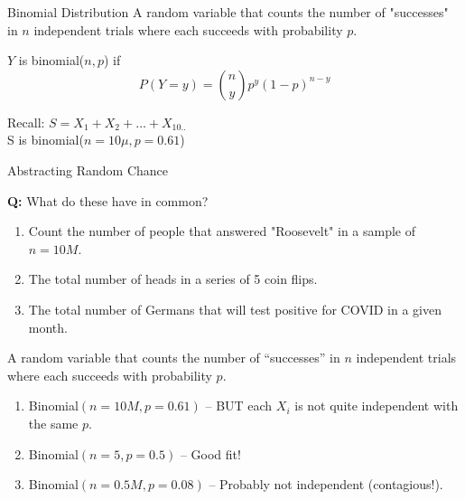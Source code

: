 \documentclass[aspectratio=169]{../latex_main/tntbeamer}  %
\begin{document}
\begin{frame}{Binomial Distribution}
    A random variable that counts the number of "successes" in $n$ independent trials where each succeeds with probability $p$.

    $Y$ is binomial($n,p$) if 
    $$P(Y=y) = \binom{n}{y}p^y(1-p)^{n-y}$$

    Recall: $S = X_1 + X_2 + \ldots + X_{10..}$\\
    S is binomial($n=10\mu, p=0.61$)
\end{frame}

\begin{frame}{Abstracting Random Chance}

    \textbf{Q:} What do these have in common?\\

    \begin{enumerate}
        \item Count the number of people that answered "Roosevelt" in a sample of $n = 10M$.
        \item The total number of heads in a series of 5 coin flips.
        \item The total number of Germans that will test positive for COVID in a given month.
    \end{enumerate}


    A random variable that counts the number of “successes” in $n$ independent trials where each succeeds with probability $p$.
    
    \begin{enumerate}
        \item Binomial$(n = 10M, p = 0.61)$ – BUT each $X_i$ is not quite independent with the same $p$.
        \item Binomial$(n = 5, p = 0.5)$ – Good fit!
        \item Binomial$(n = 0.5M, p = 0.08)$ – Probably not independent (contagious!).
    \end{enumerate}
\end{frame}
\end{document}

